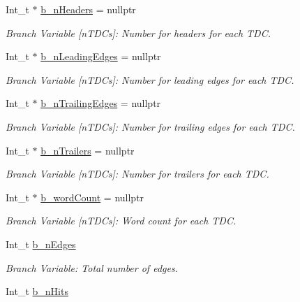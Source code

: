 \begin{DoxyCompactItemize}
Int\+\_\+t $\ast$ \hyperlink{class_event_tree_manager_ae19d6cbe28a00fcdb01ff70079a6bc4f}{b\+\_\+n\+Headers} = nullptr
\begin{DoxyCompactList}\small\item\em Branch Variable \mbox{[}n\+T\+D\+Cs\mbox{]}\+: Number for headers for each T\+DC. \end{DoxyCompactList}\item 
Int\+\_\+t $\ast$ \hyperlink{class_event_tree_manager_a9fc97a4efaccd01a9cdbe9d2c96945e6}{b\+\_\+n\+Leading\+Edges} = nullptr
\begin{DoxyCompactList}\small\item\em Branch Variable \mbox{[}n\+T\+D\+Cs\mbox{]}\+: Number for leading edges for each T\+DC. \end{DoxyCompactList}\item 
Int\+\_\+t $\ast$ \hyperlink{class_event_tree_manager_ab0372ceb9d0f6767293a4c5051a9faed}{b\+\_\+n\+Trailing\+Edges} = nullptr
\begin{DoxyCompactList}\small\item\em Branch Variable \mbox{[}n\+T\+D\+Cs\mbox{]}\+: Number for trailing edges for each T\+DC. \end{DoxyCompactList}\item 
Int\+\_\+t $\ast$ \hyperlink{class_event_tree_manager_a2afa792ed1c43104cc556b9d2cddbaf8}{b\+\_\+n\+Trailers} = nullptr
\begin{DoxyCompactList}\small\item\em Branch Variable \mbox{[}n\+T\+D\+Cs\mbox{]}\+: Number for trailers for each T\+DC. \end{DoxyCompactList}\item 
Int\+\_\+t $\ast$ \hyperlink{class_event_tree_manager_a620baae5d4f40b73d5b374d9aa21c02e}{b\+\_\+word\+Count} = nullptr
\begin{DoxyCompactList}\small\item\em Branch Variable \mbox{[}n\+T\+D\+Cs\mbox{]}\+: Word count for each T\+DC. \end{DoxyCompactList}\item 
Int\+\_\+t \hyperlink{class_event_tree_manager_acc87b9298ef951e4fbc2248ebf5c5c2f}{b\+\_\+n\+Edges}
\begin{DoxyCompactList}\small\item\em Branch Variable\+: Total number of edges. \end{DoxyCompactList}\item 
Int\+\_\+t \hyperlink{class_event_tree_manager_a4196b62d8f00bf5df0af1d432bdb6f98}{b\+\_\+n\+Hits}

\end{DoxyCompactItemize}
